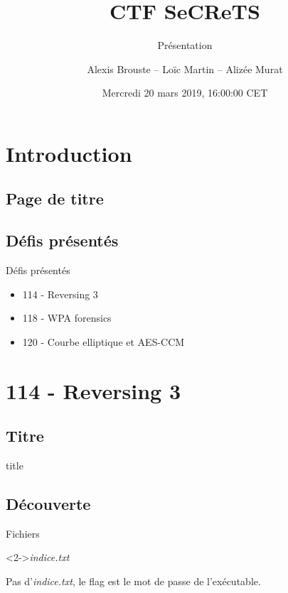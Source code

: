 \documentclass[10pt,sans,usenames,dvipsnames,french,compress]{beamer}
\title{CTF SeCReTS}
\subtitle{Présentation}
\author{Alexis Brouste -- Loïc Martin -- Alizée Murat}
\date{Mercredi 20 mars 2019, 16:00:00 CET}
\institute[UVSQ]{UVSQ}
\begin{document}
\section{Introduction}
\subsection{Page de titre}
\begin{frame}[plain]
	\titlepage
\end{frame}

\subsection{Défis présentés}
\begin{frame}{Défis présentés}
	\begin{itemize}
		\item 114 - Reversing 3
		\item 118 - WPA forensics
		\item 120 - Courbe elliptique et AES-CCM
	\end{itemize}
\end{frame}

\section{114 - Reversing 3}
\subsection{Titre}
\begin{frame}
	\begin{beamercolorbox}[sep=8pt,center]{title}
	\end{beamercolorbox}
\end{frame}

\subsection{Découverte}
\begin{frame}
	\begin{block}{Fichiers}
		\begin{small}
		\end{small}
	\end{block}

	\begin{block}<2->{\textit{indice.txt}}
		\begin{small}
			Pas d'\textit{indice.txt}, le flag est le mot de passe de l'exécutable.
		\end{small}
	\end{block}
\end{frame}
\end{document}
